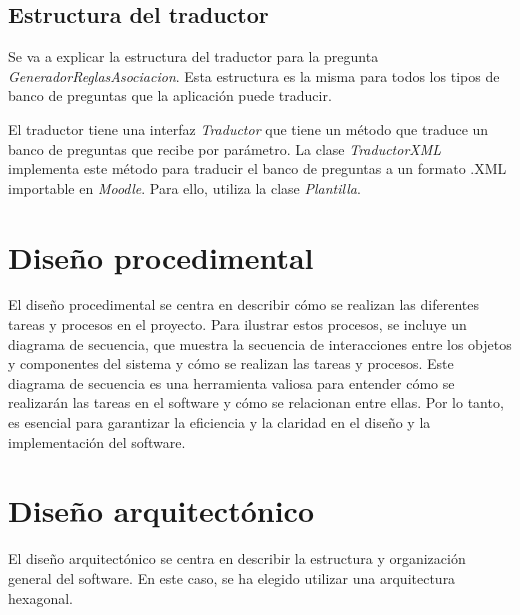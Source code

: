 \begin{landscape}
\end{landscape}

\subsection{Estructura del traductor}

Se va a explicar la estructura del traductor para la pregunta \textit{GeneradorReglasAsociacion}. Esta estructura es la misma para todos los tipos de banco de preguntas que la aplicación puede traducir. 

El traductor tiene una interfaz \textit{Traductor} que tiene un método que traduce un banco de preguntas que recibe por parámetro. La clase \textit{TraductorXML} implementa este método para traducir el banco de preguntas a un formato .XML importable en \textit{Moodle}. Para ello, utiliza la clase \textit{Plantilla}.


\section{Diseño procedimental}

El diseño procedimental se centra en describir cómo se realizan las diferentes tareas y procesos en el proyecto. Para ilustrar estos procesos, se incluye un diagrama de secuencia, que muestra la secuencia de interacciones entre los objetos y componentes del sistema y cómo se realizan las tareas y procesos. Este diagrama de secuencia es una herramienta valiosa para entender cómo se realizarán las tareas en el software y cómo se relacionan entre ellas. Por lo tanto, es esencial para garantizar la eficiencia y la claridad en el diseño y la implementación del software. \cite{wiki:diseñoprocedimentall}

\begin{landscape}
\end{landscape}

\section{Diseño arquitectónico}

El diseño arquitectónico se centra en describir la estructura y organización general del software. En este caso, se ha elegido utilizar una arquitectura hexagonal.

